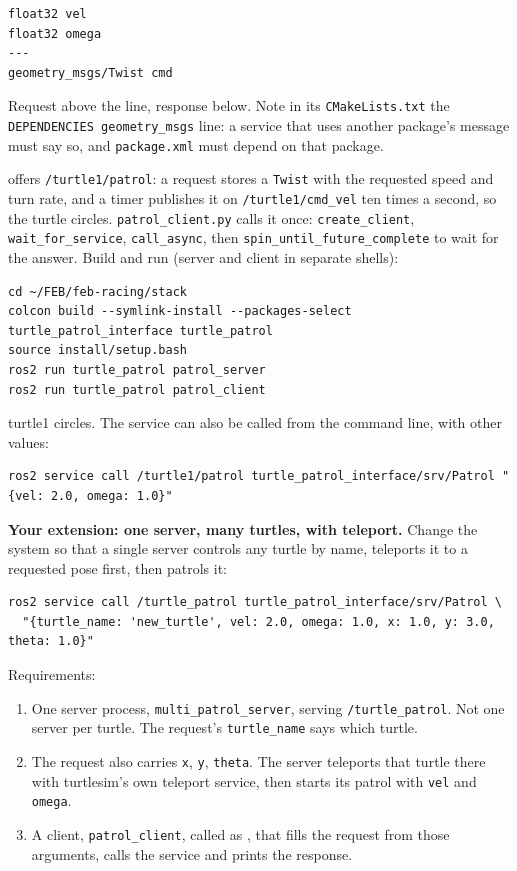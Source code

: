 \documentclass[11pt,a4paper]{article}
\begin{document}
\begin{lstlisting}
float32 vel
float32 omega
---
geometry_msgs/Twist cmd
\end{lstlisting}

Request above the line, response below. Note in its \texttt{CMakeLists.txt} the
\texttt{DEPENDENCIES geometry\_msgs} line: a service that uses another package's message must say
so, and \texttt{package.xml} must depend on that package.

 offers \texttt{/turtle1/patrol}:
a request stores a \texttt{Twist} with the requested speed and turn rate, and a timer publishes
it on \texttt{/turtle1/cmd\_vel} ten times a second, so the turtle circles.
\texttt{patrol\_client.py} calls it once: \texttt{create\_client}, \texttt{wait\_for\_service},
\texttt{call\_async}, then \texttt{spin\_until\_future\_complete} to wait for the answer. Build
and run (server and client in separate shells):

\begin{lstlisting}
cd ~/FEB/feb-racing/stack
colcon build --symlink-install --packages-select turtle_patrol_interface turtle_patrol
source install/setup.bash
ros2 run turtle_patrol patrol_server
ros2 run turtle_patrol patrol_client
\end{lstlisting}

turtle1 circles. The service can also be called from the command line, with other values:

\begin{lstlisting}
ros2 service call /turtle1/patrol turtle_patrol_interface/srv/Patrol "{vel: 2.0, omega: 1.0}"
\end{lstlisting}

\textbf{Your extension: one server, many turtles, with teleport.} Change the system so that a
single server controls any turtle by name, teleports it to a requested pose first, then patrols
it:

\begin{lstlisting}
ros2 service call /turtle_patrol turtle_patrol_interface/srv/Patrol \
  "{turtle_name: 'new_turtle', vel: 2.0, omega: 1.0, x: 1.0, y: 3.0, theta: 1.0}"
\end{lstlisting}

Requirements:
\begin{enumerate}
  \item One server process, \texttt{multi\_patrol\_server}, serving \texttt{/turtle\_patrol}. Not
  one server per turtle. The request's \texttt{turtle\_name} says which turtle.
  \item The request also carries \texttt{x}, \texttt{y}, \texttt{theta}. The server teleports that
  turtle there with turtlesim's own teleport service, then starts its patrol with \texttt{vel}
  and \texttt{omega}.
  \item A client, \texttt{patrol\_client}, called as
  , that
  fills the request from those arguments, calls the service and prints the response.
\end{enumerate}
\end{document}

